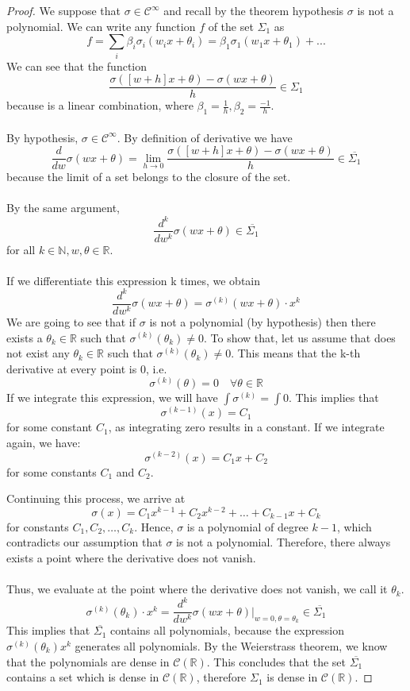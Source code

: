 \documentclass[../main.tex]{subfiles}
\begin{document}
	\begin{proof} %
		We suppose that  $\sigma \in \mathcal{C}^{\infty}$ and recall by the theorem hypothesis $\sigma$ is not a polynomial. 
		 We can write any function $f$ of the set $\Sigma_1$ as $$f=\sum_i \beta_i \sigma_i(w_i x+\theta_i)= \beta_1 \sigma_1(w_1 x+\theta_1)+ ... $$ 
		We can see that the function $$\frac{\sigma([w+h]x + \theta) - \sigma(wx+\theta)}{h} \in \Sigma_1$$ because is a linear combination, where $\beta_1= \frac{1}{h}, \beta_2=\frac{-1}{h}$. \\ \\  By hypothesis, $\sigma \in \mathcal{C}^{\infty}$. By definition of derivative we have
		$$ \frac{d}{dw}\sigma(wx+\theta)= \lim_{h \to 0} \frac{\sigma([w+h]x + \theta) - \sigma(wx+\theta)}{h}  \in \overline{\Sigma_1} %
		$$
		because the limit of a set belongs to the closure of the set. \\  \\ 
		By the same argument, $$\frac{d^k}{dw^k} \sigma(wx+\theta) \in \overline{\Sigma_1}$$  for all $k\in \mathbb{N}, w,\theta \in \mathbb{R}$.\\ \\ 
		 If we differentiate this expression k times, we obtain 
		$$ \frac{d^k}{dw^k}\sigma(wx+\theta) = \sigma^{(k)}(wx+\theta) \cdot x^{k}$$
		We are going to see that if $\sigma$ is not a polynomial (by hypothesis) then there exists a $\theta_k\in \mathbb{R}$ such that $\sigma^{(k)}(\theta_k)  \neq 0$. To show that, let us assume that does not exist any $ \theta_k \in \mathbb{R}$ such that $\sigma^{(k)}(\theta_k)  \neq 0$. This means that the k-th derivative at every point is 0, i.e. $$\sigma^{(k)}(\theta)=0  \quad \forall \theta \in \mathbb{R} $$
		\noindent  If we integrate this expression, we will have
			$\int \sigma^{(k)}= \int 0$. This implies that $$\sigma^{(k-1)}(x) = C_1$$ for some constant $C_1$, as integrating zero results in a constant. If we integrate again, we have: $$\sigma^{(k-2)}(x) = C_1x + C_2$$ for some constants $C_1$ and $C_2$.
		
		\noindent Continuing this process, we arrive at $$\sigma(x) = C_1x^{k-1} + C_2x^{k-2} + \ldots + C_{k-1}x + C_k$$ for constants $C_1, C_2, \ldots, C_k$. Hence, $\sigma$ is a polynomial of degree $k-1$, which contradicts our assumption that $\sigma$ is not a polynomial. Therefore, there always exists a point where the derivative does not vanish. \\  \\ 
		Thus, we evaluate at the point where the derivative does not vanish, we call it $\theta_k$.
		$$  \sigma^{(k)}(\theta_k) \cdot x^{k}=\frac{d^k}{dw^k}\sigma(wx+\theta) \Bigr|_{w=0, \theta=\theta_k} \in  \overline{\Sigma_1} $$ 
		This implies that $\overline{\Sigma_1}$ contains all polynomials, because the expression $\sigma^{(k)}(\theta_k) x^{k}$ generates all polynomials. By the Weierstrass theorem, we know that the polynomials are dense in $\mathcal{C}(\mathbb{R})$. This concludes that the set $\overline{\Sigma_1}$ contains a set which is dense in  $\mathcal{C}(\mathbb{R})$, therefore $\Sigma_1$ is dense in $\mathcal{C}(\mathbb{R})$.
		

\end{proof}
\end{document}
